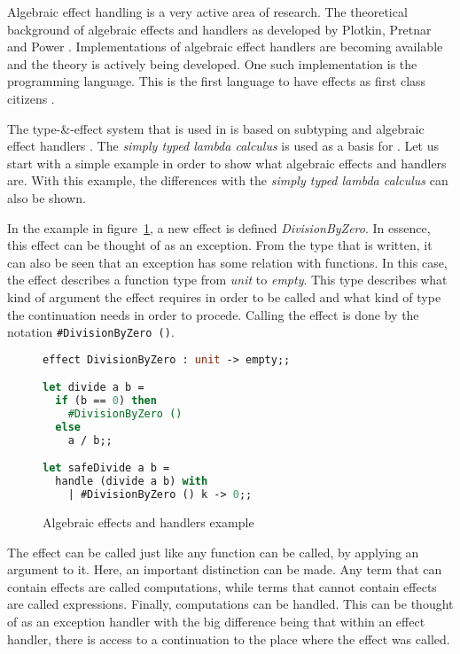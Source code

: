Algebraic effect handling is a very active area of research. The theoretical background of algebraic effects and handlers as developed by Plotkin, Pretnar and Power \cite{DBLP:journals/acs/PlotkinP03, DBLP:conf/lics/PlotkinP08}. Implementations of algebraic effect handlers are becoming available and the theory is actively being developed. One such implementation is the \eff programming language. This is the first language to have effects as first class citizens \cite{pretnar2015introduction}. 

The type-\&-effect system that is used in \eff is based on subtyping and algebraic effect handlers \cite{effectsystem}. The \textit{simply typed lambda calculus} is used as a basis for \eff.  Let us start with a simple example in order to show what algebraic effects and handlers are. With this example, the differences with the \textit{simply typed lambda calculus} can also be shown.

In the example in figure~\ref{lst:first}, a new effect is defined \textit{DivisionByZero}. In essence, this effect can be thought of as an exception. From the type that is written, it can also be seen that an exception has some relation with functions. In this case, the effect describes a function type from \textit{unit} to \textit{empty}. This type describes what kind of argument the effect requires in order to be called and what kind of type the continuation needs in order to procede. Calling the effect is done by the notation \lstinline{#DivisionByZero ()}. 

\begin{figure}
\caption{Algebraic effects and handlers example}
\label{lst:first}
\begin{lstlisting}[language=Caml]
effect DivisionByZero : unit -> empty;;

let divide a b = 
  if (b == 0) then 
    #DivisionByZero ()
  else 
    a / b;;

let safeDivide a b = 
  handle (divide a b) with 
    | #DivisionByZero () k -> 0;;
\end{lstlisting}
\end{figure}

The effect can be called just like any function can be called, by applying an argument to it. Here, an important distinction can be made. Any term that can contain effects are called computations, while terms that cannot contain effects are called expressions. Finally, computations can be handled. This can be thought of as an exception handler with the big difference being that within an effect handler, there is access to a continuation to the place where the effect was called. 

